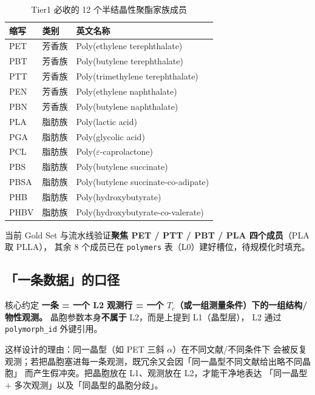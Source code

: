 \documentclass[11pt,a4paper]{ctexart}
\begin{document}
\begin{table}[htbp]
\centering
\caption{Tier1 必收的 12 个半结晶性聚酯家族成员}
\label{tab:members}
\begin{tabularx}{\textwidth}{l l X}
\toprule
缩写 & 类别 & 英文名称 \\
\midrule
PET  & 芳香族 & Poly(ethylene terephthalate) \\
PBT  & 芳香族 & Poly(butylene terephthalate) \\
PTT  & 芳香族 & Poly(trimethylene terephthalate) \\
PEN  & 芳香族 & Poly(ethylene naphthalate) \\
PBN  & 芳香族 & Poly(butylene naphthalate) \\
PLA  & 脂肪族 & Poly(lactic acid) \\
PGA  & 脂肪族 & Poly(glycolic acid) \\
PCL  & 脂肪族 & Poly($\varepsilon$-caprolactone) \\
PBS  & 脂肪族 & Poly(butylene succinate) \\
PBSA & 脂肪族 & Poly(butylene succinate-co-adipate) \\
PHB  & 脂肪族 & Poly(hydroxybutyrate) \\
PHBV & 脂肪族 & Poly(hydroxybutyrate-co-valerate) \\
\bottomrule
\end{tabularx}
\end{table}

当前 Gold Set 与流水线验证\textbf{聚焦 PET / PTT / PBT / PLA 四个成员}（PLA 取 PLLA），
其余 8 个成员已在 \texttt{polymers} 表（L0）建好槽位，待规模化时填充。

\subsection{「一条数据」的口径}

\begin{tipbox}{核心约定}
\textbf{一条 = 一个 L2 观测行 = 一个 $T_c$（或一组测量条件）下的一组结构/物性观测。}
晶胞参数本身\textbf{不属于} L2，而是上提到 L1（晶型层），
L2 通过 \texttt{polymorph\_id} 外键引用。
\end{tipbox}

这样设计的理由：同一晶型（如 PET 三斜 $\alpha$）在不同文献/不同条件下
会被反复观测；若把晶胞塞进每一条观测，既冗余又会因「同一晶型不同文献给出略不同晶胞」
而产生假冲突。把晶胞放在 L1、观测放在 L2，才能干净地表达
「同一晶型 + 多次观测」以及「同晶型的晶胞分歧」。

\end{document}
